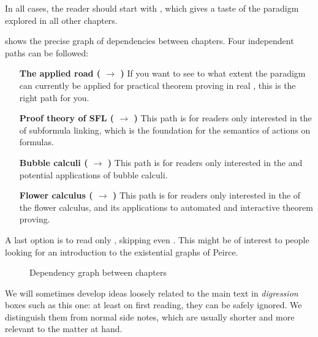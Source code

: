\begin{emphpar}
  In all cases, the reader should start with , which gives a taste of
  the  paradigm explored in all other chapters.
\end{emphpar}

 shows the precise graph of dependencies between chapters.
Four independent paths can be followed:
\begin{itemize}
  \item[\textbf{The applied road (\ding{175} $\to$ \ding{177})}] If
  you want to see to what extent the  paradigm can currently be applied for
  practical theorem proving in real , this is the right path for
  you.

  \item[\textbf{Proof theory of SFL (\ding{174} $\to$ \ding{176})}]
  This path is for readers only interested in the  of subformula
  linking, which is the foundation for the semantics of  actions on 
  formulas.

  \item[\textbf{Bubble calculi (\ding{178} $\to$ \ding{179})}]
  This path is for readers only interested in the  and potential
  applications of bubble calculi.
  
  \item[\textbf{Flower calculus (\ding{180} $\to$ \ding{181})}] This path is for
  readers only interested in the  of the flower calculus, and its
  applications to automated and interactive theorem proving.
\end{itemize}

A last option is to read only , skipping even . This might
be of interest to people looking for an introduction to the existential graphs
of Peirce.

\begin{figure*}
  \caption{Dependency graph between chapters}
\end{figure*}

\begin{digression}
  We will sometimes develop ideas loosely related to the main text in
  \emph{digression} boxes such as this one: at least on first reading, they can
  be safely ignored. We distinguish them from normal side notes, which are
  usually shorter and more relevant to the matter at hand.
\end{digression}

